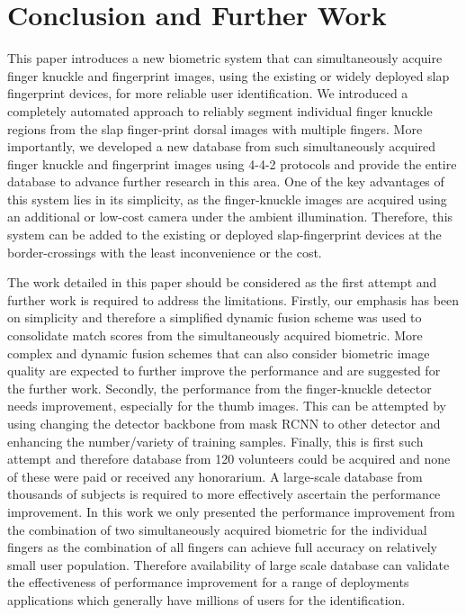 \section{Conclusion and Further Work\label{conclusion}}

This paper introduces a new biometric system that can simultaneously acquire finger knuckle and fingerprint images, using the existing or widely deployed slap fingerprint devices, for more reliable user identification. We introduced a completely automated approach to reliably segment individual finger knuckle regions from the slap finger-print dorsal images with multiple fingers. More importantly, we developed a new database from such simultaneously acquired finger knuckle and fingerprint images using 4-4-2 protocols and provide \cite{datalink} the entire database to advance further research in this area. One of the key advantages of this system lies in its simplicity, as the finger-knuckle images are acquired using an additional or low-cost camera under the ambient illumination. Therefore, this system can be added to the existing or deployed slap-fingerprint devices at the border-crossings with the least inconvenience or the cost.    

The work detailed in this paper should be considered as the first attempt and further work is required to address the limitations. Firstly, our emphasis has been on simplicity and therefore a simplified dynamic fusion scheme was used to consolidate match scores from the simultaneously acquired biometric. More complex and dynamic fusion schemes that can also consider biometric image quality are expected to further improve the performance and are suggested for the further work. Secondly, the performance from the finger-knuckle detector needs improvement, especially for the thumb images. This can be attempted by using changing the detector backbone from mask RCNN to other detector \cite{redmon2016you} and enhancing the number/variety of training samples. Finally, this is first such attempt and therefore database from 120 volunteers could be acquired and none of these were paid or received any honorarium. A large-scale database from thousands of subjects is required to more effectively ascertain the performance improvement. In this work we only presented the performance improvement from the combination of two simultaneously acquired biometric for the individual fingers as the combination of all fingers can achieve full accuracy on relatively small user population. Therefore availability of large scale database can validate the effectiveness of performance improvement for a range of deployments applications which generally have millions of users for the identification.